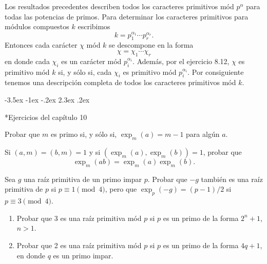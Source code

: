 \documentclass[12pt,a4paper]{book}
\makeatletter
\renewcommand\section{\@startsection{section}{1}{\z@}%
  {-3.5ex \@plus -1ex \@minus -.2ex}%
  {2.3ex \@plus .2ex}%
  {\normalfont\Large\bfseries\raggedright}}
\makeatother
\begin{document}
    Los resultados precedentes describen todos los caracteres primitivos mód $p^{\alpha}$
    para todas las potencias de primos. Para determinar los caracteres primitivos para
    módulos compuestos $k$ escribimos
    \begin{equation*}
        k=p_{1}^{\alpha_{1}}\cdots p_{r}^{\alpha_{r}}.
    \end{equation*}
    Entonces cada carácter $\chi$ mód $k$ se descompone en la forma
    \begin{equation*}
        \chi=\chi_{1}\cdots\chi_{r}
    \end{equation*}
    en donde cada $\chi_{i}$ es un carácter mód $p_{i}^{\alpha_{i}}$. Además, por el ejercicio
    8.12, $\chi$ es primitivo mód $k$ si, y sólo si, cada $\chi_{i}$ es primitivo mód
    $p_{i}^{\alpha_{i}}$. Por consiguiente tenemos una descripción completa de todos los
    caracteres primitivos mód $k$.

    \section*{Ejercicios del capítulo 10}

    \begin{ejercicio}
        Probar que $m$ es primo si, y sólo si, $\exp_{m}(a)=m-1$ para algún $a$.
    \end{ejercicio}

    \begin{ejercicio}
        Si $(a,m)=(b,m)=1$ y si $(\exp_{m}(a),\exp_{m}(b))=1$, probar que
        \begin{equation*}
            \exp_{m}(ab)=\exp_{m}(a)\exp_{m}(b).
        \end{equation*}
    \end{ejercicio}

    \begin{ejercicio}
        Sea $g$ una raíz primitiva de un primo impar $p$. Probar que $-g$ también es una
        raíz primitiva de $p$ si $p\equiv1\pmod{4}$, pero que $\exp_{p}(-g)=(p-1)/2$ si
        $p\equiv3\pmod{4}$.
    \end{ejercicio}

    \begin{ejercicio}
        \begin{enumerate}
            \item[(a)] Probar que 3 es una raíz primitiva mód $p$ si $p$ es un primo de la
            forma $2^{n}+1$, $n>1$.
            \item[(b)] Probar que 2 es una raíz primitiva mód $p$ si $p$ es un primo de la
            forma $4q+1$, en donde $q$ es un primo impar.
        \end{enumerate}
    \end{ejercicio}
\end{document}
